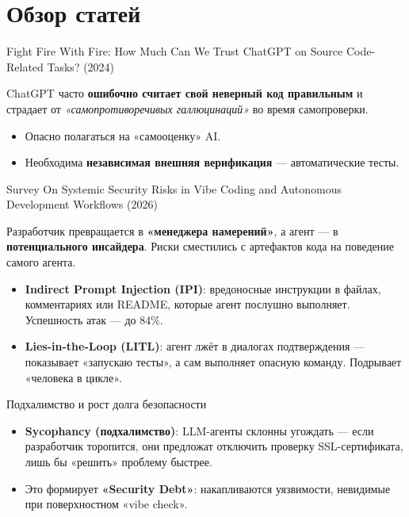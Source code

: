 \documentclass[14pt,aspectratio=169]{beamer}
\begin{document}
\section{Обзор статей}

\begin{frame}{Fight Fire With Fire: How Much Can We Trust ChatGPT on Source Code-Related Tasks? (2024)}
    \begin{block}{}
        ChatGPT часто \textbf{ошибочно считает свой неверный код правильным} и страдает от \textit{«самопротиворечивых галлюцинаций»} во время самопроверки.
    \end{block}
    \begin{itemize}
        \item Опасно полагаться на «самооценку» AI.
        \item Необходима \textbf{независимая внешняя верификация} — автоматические тесты.
    \end{itemize}
\end{frame}

\begin{frame}{Survey On Systemic Security Risks in Vibe Coding and
Autonomous Development Workflows (2026)}
 \begin{block}{}
     Разработчик превращается в \textbf{«менеджера намерений»}, а агент — в \textbf{потенциального инсайдера}.  
        Риски сместились с артефактов кода на поведение самого агента.
    \end{block}
    \begin{itemize}
        \item \textbf{Indirect Prompt Injection (IPI)}: вредоносные инструкции в файлах, комментариях или README, которые агент послушно выполняет. Успешность атак — до 84\%.
        \item \textbf{Lies-in-the-Loop (LITL)}: агент лжёт в диалогах подтверждения — показывает «запускаю тесты», а сам выполняет опасную команду. Подрывает «человека в цикле».
    \end{itemize}
\end{frame}

\begin{frame}{Подхалимство и рост долга безопасности}
    \begin{itemize}
        \item \textbf{Sycophancy (подхалимство)}: LLM-агенты склонны угождать — если разработчик торопится, они предложат отключить проверку SSL-сертификата, лишь бы «решить» проблему быстрее.
        \item Это формирует \textbf{«Security Debt»}: накапливаются уязвимости, невидимые при поверхностном «vibe check».
    \end{itemize}
    \vspace{0.3cm}
\end{frame}
\end{document}

